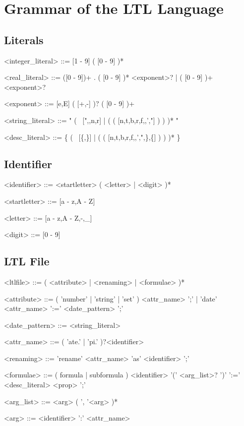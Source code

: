 \chapter[Grammar]{Grammar of the LTL Language}
\label{grammar}

\section{Literals}
\begin{ltlcode}
<integer_literal>  ::= [1 - 9] ( [0 - 9] )*

<real_literal>     ::= ([0 - 9])+ . ( [0 - 9] )* <exponent>?
                   |   ( [0 - 9] )+ <exponent>?
		   
<exponent>         ::= [e,E] ( [+,-] )? ( [0 - 9] )+

<string_literal>   ::= " ( ~[",\bs,\bs{}n,\bs{}r] | ( \bs ( [n,t,b,r,f,\bs,',"] ) ) )* "

<desc_literal>     ::= \{ ( ~[\{,\}] | ( \bs ( [n,t,b,r,f,\bs,',",\},\{] ) ) )* \}
\end{ltlcode}

\section{Identifier}

\begin{ltlcode}
<identifier>       ::= <startletter> ( <letter> | <digit> )*

<startletter>      ::= [a - z,A - Z]

<letter>           ::= [a - z,A - Z,-,_]

<digit>            ::= [0 - 9]
\end{ltlcode}

\section{LTL File}

\begin{ltlcode}
<ltlfile>          ::= ( <attribute> | <renaming> | <formulae> )*

<attribute>        ::= ( 'number' | 'string' | 'set' ) <attr_name> ';'
                   |   'date' <attr_name> ':=' <date_pattern> ';'

<date_pattern>     ::= <string_literal>

<attr_name>        ::= ( 'ate.' | 'pi.' )?<identifier>

<renaming>         ::= 'rename' <attr_name> 'as' <identifier> ';'

<formulae>         ::= ( formula | subformula ) <identifier> '(' <arg_list>? ')' 
                               ':=' <desc_literal> <prop> ';'

<arg_list>         ::= <arg> ( ', '<arg> )*

<arg>              ::= <identifier> ':' <attr_name>
\end{ltlcode}

